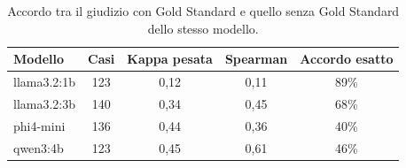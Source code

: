 \begin{table}[htbp]
  \centering
  \small
  \begin{tabular}{lcccc}
    \toprule
    \textbf{Modello} & \textbf{Casi} & \textbf{Kappa pesata} & \textbf{Spearman} & \textbf{Accordo esatto} \\
    \midrule
    llama3.2:1b & 123 & 0,12 & 0,11 & 89\% \\
    llama3.2:3b & 140 & 0,34 & 0,45 & 68\% \\
    phi4-mini & 136 & 0,44 & 0,36 & 40\% \\
    qwen3:4b & 123 & 0,45 & 0,61 & 46\% \\
    \bottomrule
  \end{tabular}
  \caption{Accordo tra il giudizio con Gold Standard e quello senza Gold Standard dello stesso modello.}
  \label{tab:judge-gs-vs-nogs}
\end{table}
